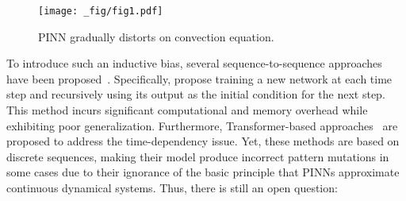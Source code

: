 
\begin{figure}[t!]
    \centering
    \texttt{[image: \_fig/fig1.pdf]}
    \vspace{-6mm}
    \caption{PINN gradually distorts on convection equation.}
    \label{fig1}
    \vspace{-5mm}
\end{figure}


To introduce such an inductive bias, several sequence-to-sequence approaches have been proposed~\cite{krishnapriyan2021characterizing,zhao2024pinnsformer,yang2022learning,gao2022earthformer}. Specifically, \citet{krishnapriyan2021characterizing} propose training a new network at each time step and recursively using its output as the initial condition for the next step. This method incurs significant computational and memory overhead while exhibiting poor generalization. Furthermore, Transformer-based approaches~\cite{zhao2024pinnsformer,yang2022learning,gao2022earthformer} are proposed to address the time-dependency issue. Yet, these methods are based on discrete sequences, making their model produce incorrect pattern mutations in some cases due to their ignorance of the basic principle that PINNs approximate continuous dynamical systems. Thus, there is still an open question:


